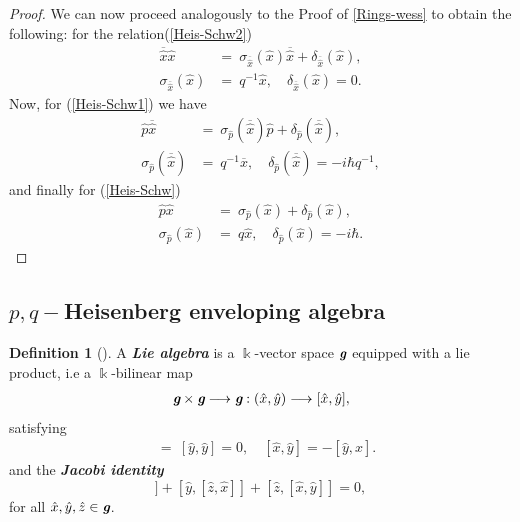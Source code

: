 \documentclass[12pt,a4paper]{article}
\theoremstyle{plain}
\theoremstyle{definition}
\newtheorem{definition}[theorem]{Definition}
\theoremstyle{remark}
\begin{document}
\begin{proof}
    We can now proceed analogously to the Proof of \ref{Rings-wess} to obtain the following: for the relation(\ref{Heis-Schw2}) 
    \begin{align*}
        \overline{\hat{x}}\hat{x} & = \ \sigma_{\overline{\hat{x}}}(\hat{x})\overline{\hat{x}}+\delta_{\overline{\hat{x}}}(\hat{x}),\\
        \sigma_{\overline{\hat{x}}}(\hat{x}) & = \ q^{-1}\hat{x}, \quad \delta_{\overline{\hat{x}}}(\hat{x})=0.
    \end{align*}
    Now, for (\ref{Heis-Schw1}) we have
    \begin{align*}
        \hat{p}\overline{\hat{x}} & = \ \sigma_{\hat{p}}(\overline{\hat{x}})\hat{p}+\delta_{\hat{p}}(\overline{\hat{x}}),\\
        \sigma_{\hat{p}}(\overline{\hat{x}}) & = \ q^{-1}\overline{x}, \quad \delta_{\hat{p}}(\overline{\hat{x}})=-i\hbar q^{-1},
    \end{align*}
    and finally for (\ref{Heis-Schw}) 
    \begin{align*}
        \hat{p}\hat{x} & = \ \sigma_{\hat{p}}(\hat{x})+\delta_{\hat{p}}(\hat{x}),\\
        \sigma_{\hat{p}}(\hat{x}) & = \ q\hat{x}, \quad \delta_{\hat{p}}(\hat{x}) = -i\hbar .
    \end{align*}
\end{proof}
\subsection{\texorpdfstring{$p,q-$}{Lg}Heisenberg enveloping algebra}\label{env}

\begin{definition}[{\cite[p. xix]{Goodearl-Warfield}}]
    A \textit{\textbf{Lie algebra}} is a $\Bbbk$-vector space $\textit{\textbf{g}}$ equipped with a lie product, i.e a $\Bbbk$-bilinear map 
    \begin{align*}
    \textit{\textbf{g}}\times\textit{\textbf{g}}\longrightarrow \textit{\textbf{g}}: (\hat{x}, \hat{y})\longrightarrow [\hat{x}, \hat{y}],
    \end{align*}
    satisfying 
    \begin{align*}
    [\hat{x}, \hat{x}] & = \ [\hat{y}, \hat{y}]=0, \quad [\hat{x}, \hat{y}]=-[\hat{y}, \hat{x}].
    \end{align*}
    and the \textit{\textbf{Jacobi identity}} 
    \begin{equation*}
    [\hat{x},[\hat{y}, \hat{z}]]+[\hat{y},[\hat{z}, \hat{x}]]+[\hat{z},[\hat{x}, \hat{y}]]=0,
    \end{equation*}
    for all $\hat{x},\hat{y}, \hat{z}\in\textit{\textbf{g}}$.
\end{definition}
\end{document}
